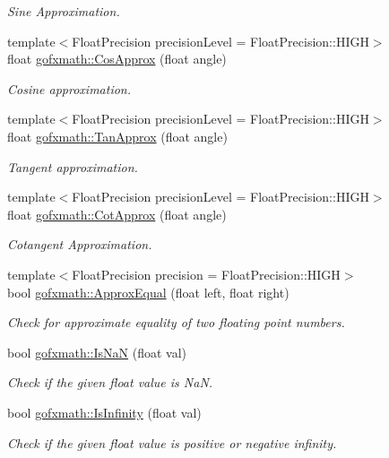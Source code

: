 \begin{DoxyCompactItemize}
\begin{DoxyCompactList}\small\item\em Sine Approximation. \end{DoxyCompactList}\item 
{\footnotesize template$<$Float\+Precision precision\+Level = Float\+Precision\+::\+H\+I\+G\+H$>$ }\\float \hyperlink{group___s_i_s_d_scalar_math_ga6f84a45d1d98a6be758df9fc78615000}{gofxmath\+::\+Cos\+Approx} (float angle)
\begin{DoxyCompactList}\small\item\em Cosine approximation. \end{DoxyCompactList}\item 
{\footnotesize template$<$Float\+Precision precision\+Level = Float\+Precision\+::\+H\+I\+G\+H$>$ }\\float \hyperlink{group___s_i_s_d_scalar_math_ga38631bdf076826ca766dc35f3b150897}{gofxmath\+::\+Tan\+Approx} (float angle)
\begin{DoxyCompactList}\small\item\em Tangent approximation. \end{DoxyCompactList}\item 
{\footnotesize template$<$Float\+Precision precision\+Level = Float\+Precision\+::\+H\+I\+G\+H$>$ }\\float \hyperlink{group___s_i_s_d_scalar_math_gac1c6ea5bb8f4958158ccb1a33123d64b}{gofxmath\+::\+Cot\+Approx} (float angle)
\begin{DoxyCompactList}\small\item\em Cotangent Approximation. \end{DoxyCompactList}\item 
{\footnotesize template$<$Float\+Precision precision = Float\+Precision\+::\+H\+I\+G\+H$>$ }\\bool \hyperlink{group___s_i_s_d_scalar_math_gac302f56236758d08c1923095e381e53b}{gofxmath\+::\+Approx\+Equal} (float left, float right)
\begin{DoxyCompactList}\small\item\em Check for approximate equality of two floating point numbers. \end{DoxyCompactList}\item 
bool \hyperlink{group___s_i_s_d_scalar_math_gafa30a49468e40679f196b2bc791849e5}{gofxmath\+::\+Is\+Na\+N} (float val)
\begin{DoxyCompactList}\small\item\em Check if the given float value is Na\+N. \end{DoxyCompactList}\item 
bool \hyperlink{group___s_i_s_d_scalar_math_ga56a70269c92df99f699e0456613e4a52}{gofxmath\+::\+Is\+Infinity} (float val)
\begin{DoxyCompactList}\small\item\em Check if the given float value is positive or negative infinity. \end{DoxyCompactList}\end{DoxyCompactItemize}


